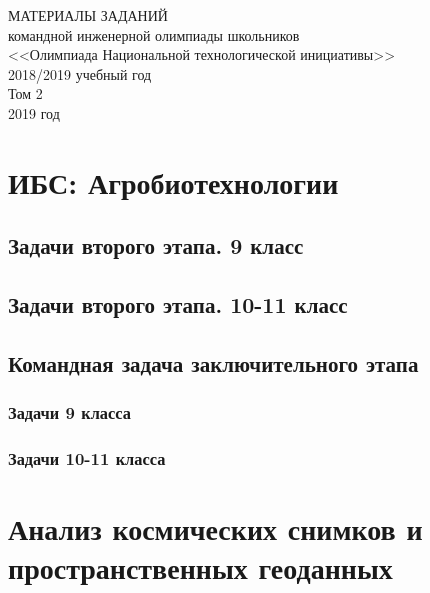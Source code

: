 \documentclass[a4paper,12pt,oneside]{book}
\begin{document}
\begin{titlepage}
    \begin{center}
        \huge{МАТЕРИАЛЫ ЗАДАНИЙ} \\
        \Large{командной инженерной олимпиады школьников} \\
        \Large{<<Олимпиада Национальной технологической инициативы>>} \\
        \large{2018/2019 учебный год} \\
        \large{Том 2} \\
        \vspace{14cm}
        \Large{2019 год}  
    \end{center}
  \end{titlepage}
\setcounter{tocdepth}{1}

\tableofcontents

\part{ИБС: Агробиотехнологии}
\clearpage 
\chapter{Задачи второго этапа. 9 класс}

\chapter{Задачи второго этапа. 10-11 класс}

\clearpage 
\chapter{Командная задача заключительного этапа}
\section{Задачи 9 класса} 

\section{Задачи 10-11 класса}


\part{Анализ космических снимков и пространственных геоданных}
\clearpage
\end{document}
